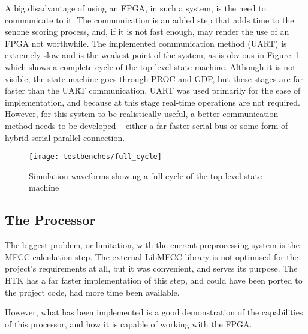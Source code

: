 		A big disadvantage of using an FPGA, in such a system, is the need to communicate to it.  The communication is an added step that adds time to the senone scoring process, and, if it is not fast enough, may render the use of an FPGA not worthwhile.  The implemented communication method (UART) is extremely slow and is the weakest point of the system, as is obvious in Figure~\ref{fig:full_cycle} which shows a complete cycle of the top level state machine.  Although it is not visible, the state machine goes through PROC and GDP, but these stages are far faster than the UART communication.  UART was used primarily for the ease of implementation, and because at this stage real-time operations are not required.  However, for this system to be realistically useful, a better communication method needs to be developed -- either a far faster serial bus or some form of hybrid serial-parallel connection.

		\begin{figure}[tb]
			\begin{center}
				\texttt{[image: testbenches/full\_cycle]}
			\end{center}
			\caption{Simulation waveforms showing a full cycle of the top level state machine}
			\label{fig:full_cycle}
		\end{figure}



	\subsection{The Processor} %
	\label{sub:analysis_the_processor}
		The biggest problem, or limitation, with the current preprocessing system is the MFCC calculation step.  The external LibMFCC library is not optimised for the project's requirements at all, but it was convenient, and serves its purpose.  The HTK has a far faster implementation of this step, and could have been ported to the project code, had more time been available.

		However, what has been implemented is a good demonstration of the capabilities of this processor, and how it is capable of working with the FPGA.


